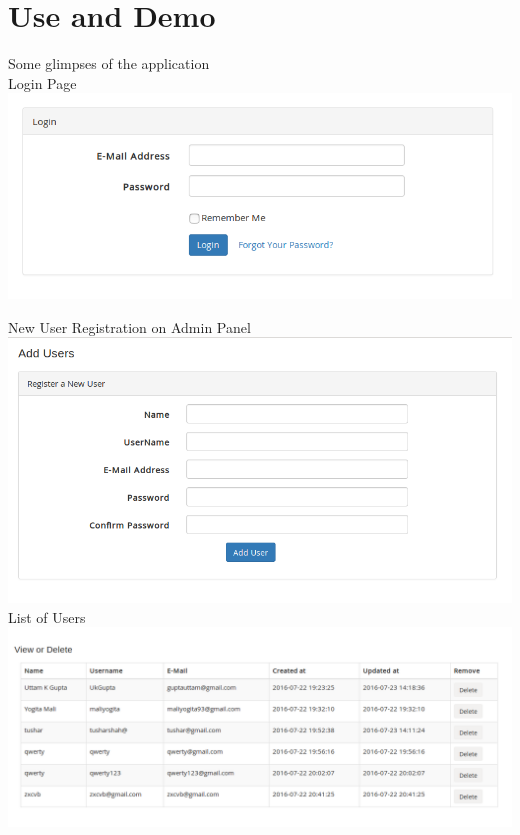 \documentclass[a4paper,12pt,oneside]{book}
\begin{document}
\section{Use and Demo}
Some glimpses of the application\\
Login Page \\
\includegraphics[scale=0.5]{login.png} \\

\vspace{0.7in}

New User Registration on Admin Panel \\
\includegraphics[scale=0.45]{user.png}	\\

\vspace{0.7in}
List of Users \\
\includegraphics[scale=0.35]{user2.png}	\\
\end{document}
